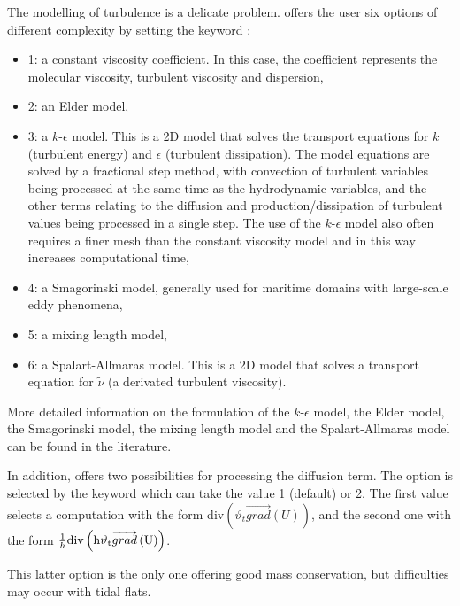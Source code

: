 The modelling of turbulence is a delicate problem.
 offers the user six options of different complexity by setting
the keyword :
\begin{itemize}
\item 1: a constant viscosity coefficient.
In this case, the coefficient represents the molecular viscosity,
turbulent viscosity and dispersion,

\item 2: an Elder model,

\item 3: a $k$-$\epsilon$ model.
This is a 2D model that solves the transport equations for $k$ (turbulent energy)
and $\epsilon$ (turbulent dissipation).
The model equations are solved by a fractional step method, with convection of
turbulent variables being processed at the same time as the hydrodynamic
variables, and the other terms relating to the diffusion and
production/dissipation of turbulent values being processed in a single step.
The use of the $k$-$\epsilon$ model also often requires a finer mesh
than the constant viscosity model and in this way increases computational time,

\item 4: a Smagorinski model, generally used for maritime
domains with large-scale eddy phenomena,

\item 5: a mixing length model,

\item 6: a Spalart-Allmaras model.
This is a 2D model that solves a transport equation for $\tilde{\nu}$
(a derivated turbulent viscosity).

\end{itemize}

More detailed information on the formulation of the $k$-$\epsilon$ model,
the Elder model, the Smagorinski model, the mixing length model and the
Spalart-Allmaras model can be found in the literature.

In addition,  offers two possibilities for processing the diffusion
term.
The option is selected by the keyword
which can take the value 1 (default) or 2.
The first value selects a computation with the form
div$\left({\vartheta }_t\overrightarrow{grad}\left(U\right)\right)$,
and the second one with the form
$\frac{1}{h}\rm{div}\left({h\vartheta_t }\overrightarrow{grad}\left(U\right)\right)$.

This latter option is the only one offering good mass conservation,
but difficulties may occur with tidal flats.


